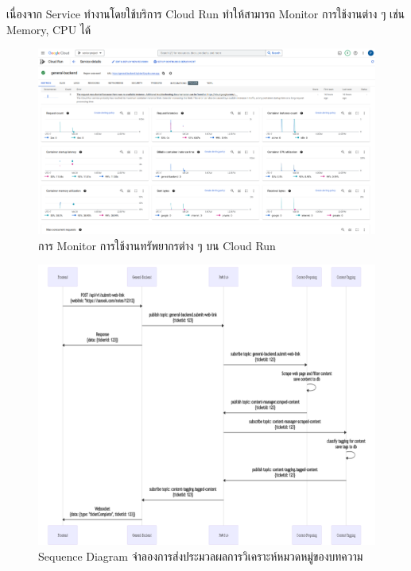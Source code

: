 \documentclass[12pt,oneside,openright,a4paper]{cpe-thai-project}
\begin{document}
  \hspace{1cm}เนื่องจาก Service ทำงานโดยใช้บริการ Cloud Run ทำให้สามารถ Monitor การใช้งานต่าง ๆ เช่น Memory, CPU ได้ 
  \begin{figure}[!ht]\centering
    \includegraphics[width=\textwidth]{./img/monitor.png}
    \caption{การ Monitor การใช้งานทรัพยากรต่าง ๆ บน Cloud Run}\label{fig:monitor}
  \end{figure}
  \newpage    
  \begin{figure}[!ht]\centering
    \includegraphics[width=\textwidth]{./img/request_process_flow.png}
    \caption{Sequence Diagram จำลองการส่งประมวลผลการวิเคราะห์หมวดหมู่ของบทความ}\label{fig:req_proc} 
  \end{figure}
  
\end{document}
